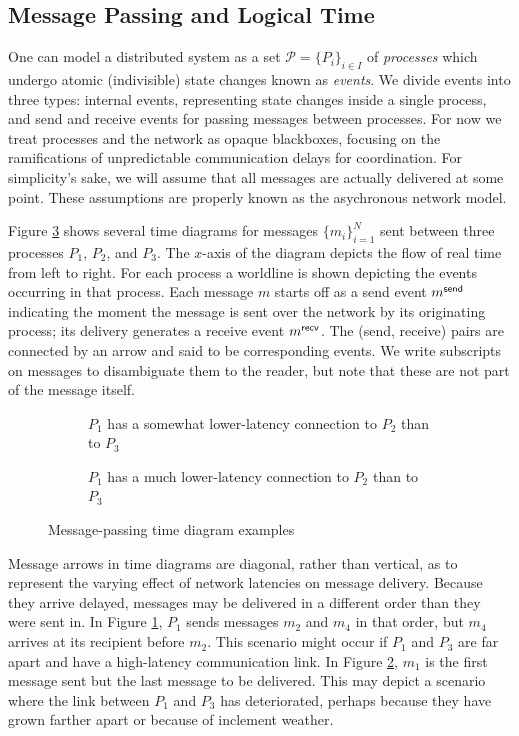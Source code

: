 \documentclass[]             %
{NASA}                       %
\theoremstyle{definition}
\begin{document}
\subsection{Message Passing and Logical Time}
\label{ssec:message-passing}
One can model a distributed system as a set
\(\mathcal{P} = \{P_i\}_{i\in I}\) of \emph{processes} which undergo
atomic (indivisible) state changes known as \emph{events}. We divide
events into three types: internal events, representing state changes
inside a single process, and send and receive events for passing
messages between processes. For now we treat processes and the network
as opaque blackboxes, focusing on the ramifications of unpredictable
communication delays for coordination.  For simplicity's sake, we will
assume that all messages are actually delivered at some point. These
assumptions are properly known as the asychronous network model.

Figure \ref{fig:message-latencies} shows several time diagrams for
messages $\{m_i\}_{i=1}^N$ sent between three processes $P_1$, $P_2$,
and $P_3$. The $x$-axis of the diagram depicts the flow of real time
from left to right. For each process a worldline is shown depicting
the events occurring in that process. Each message $m$ starts off as a
send event $m_{}^{\mathsf{send}}$ indicating the moment the message is sent over
the network by its originating process; its delivery generates a
receive event $m_{}^{\mathsf{recv}}$. The (send, receive) pairs are connected by
an arrow and said to be corresponding events. We write subscripts on
messages to disambiguate them to the reader, but note that these are
not part of the message itself.

\begin{figure}[p]
  \setlength\belowcaptionskip{5ex}
  \begin{subfigure}{1\textwidth}
    \centering
    
    \caption{$P_1$ has a somewhat lower-latency connection to $P_2$ than to $P_3$}
    \label{fig:message-latencies-a}
  \end{subfigure}
  \begin{subfigure}{1\textwidth}
    \centering 
    \caption{$P_1$ has a much lower-latency connection to $P_2$ than to $P_3$}
    \label{fig:message-latencies-b}
  \end{subfigure}
  \caption{Message-passing time diagram examples}
  \label{fig:message-latencies}
\end{figure}

Message arrows in time diagrams are diagonal, rather than vertical, as
to represent the varying effect of network latencies on message
delivery. Because they arrive delayed, messages may be delivered in a
different order than they were sent in. In Figure
\ref{fig:message-latencies-a}, $P_1$ sends messages $m_2$ and $m_4$ in
that order, but $m_4$ arrives at its recipient before $m_2$. This
scenario might occur if $P_1$ and $P_3$ are far apart and have a
high-latency communication link. In Figure
\ref{fig:message-latencies-b}, $m_1$ is the first message sent but the
last message to be delivered. This may depict a scenario where the
link between $P_1$ and $P_3$ has deteriorated, perhaps because they
have grown farther apart or because of inclement weather.
\end{document}
